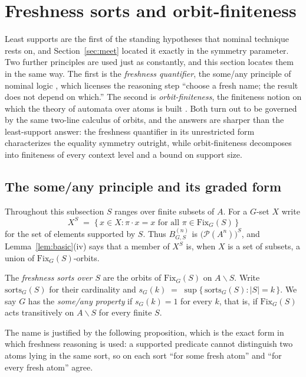 \documentclass{lmcs}
\newcommand{\Fix}{\mathrm{Fix}}
\begin{document}
\section{Freshness sorts and orbit-finiteness}
\label{sec:fresh}

Least supports are the first of the standing hypotheses that nominal
technique rests on, and Section~\ref{sec:meet} located it exactly in the
symmetry parameter. Two further principles are used just as constantly,
and this section locates them in the same way. The first is the
\emph{freshness quantifier}, the \textsf{some/any} principle of nominal
logic \cite{Pitts13}, which licenses the reasoning step
``choose a fresh name; the result does not depend on which.'' The
second is \emph{orbit-finiteness}, the finiteness notion on which the
theory of automata over atoms is built \cite{BKL14}. Both turn out to
be governed by the same two-line calculus of orbits, and the answers are
sharper than the least-support answer: the freshness quantifier in its
unrestricted form characterizes the equality symmetry outright, while
orbit-finiteness decomposes into finiteness of every context level and a
bound on support size.

\subsection{The some/any principle and its graded form}
\label{subsec:someany}

Throughout this subsection $S$ ranges over finite subsets of $A$. For a
$G$-set $X$ write
\[
   X^{S}\;=\;\{\,x\in X:\pi\cdot x=x\text{ for all }\pi\in\Fix_G(S)\,\}
\]
for the set of elements supported by $S$. Thus $B^{(n)}_{G,S}$ is
$\bigl(\mathcal P(A^n)\bigr)^{S}$, and Lemma~\ref{lem:basic}(iv) says
that a member of $X^{S}$ is, when $X$ is a set of subsets, a union of
$\Fix_G(S)$-orbits.

\begin{defi}\label{def:sorts}
The \emph{freshness sorts over $S$} are the orbits of $\Fix_G(S)$ on
$A\smallsetminus S$. Write $\mathrm{sorts}_G(S)$ for their cardinality and
$ s_G(k)\;=\;\sup\{\,\mathrm{sorts}_G(S):|S|=k\,\}$.
We say $G$ has the \emph{some/any property} if $s_G(k)=1$ for every
$k$, that is, if $\Fix_G(S)$ acts transitively on $A\smallsetminus S$
for every finite $S$.
\end{defi}

The name is justified by the following proposition, which is the exact
form in which freshness reasoning is used: a supported predicate cannot
distinguish two atoms lying in the same sort, so on each sort
``for some fresh atom'' and ``for every fresh atom'' agree.
\end{document}
